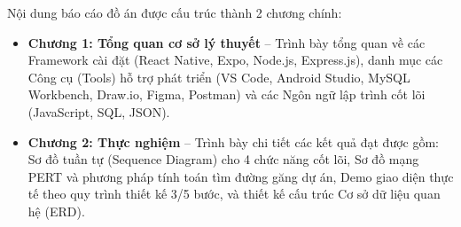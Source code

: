 Nội dung báo cáo đồ án được cấu trúc thành 2 chương chính:
\begin{itemize}
    \item \textbf{Chương 1: Tổng quan cơ sở lý thuyết} -- Trình bày tổng quan về các Framework cài đặt (React Native, Expo, Node.js, Express.js), danh mục các Công cụ (Tools) hỗ trợ phát triển (VS Code, Android Studio, MySQL Workbench, Draw.io, Figma, Postman) và các Ngôn ngữ lập trình cốt lõi (JavaScript, SQL, JSON).
    \item \textbf{Chương 2: Thực nghiệm} -- Trình bày chi tiết các kết quả đạt được gồm: Sơ đồ tuần tự (Sequence Diagram) cho 4 chức năng cốt lõi, Sơ đồ mạng PERT và phương pháp tính toán tìm đường găng dự án, Demo giao diện thực tế theo quy trình thiết kế 3/5 bước, và thiết kế cấu trúc Cơ sở dữ liệu quan hệ (ERD).
\end{itemize}
